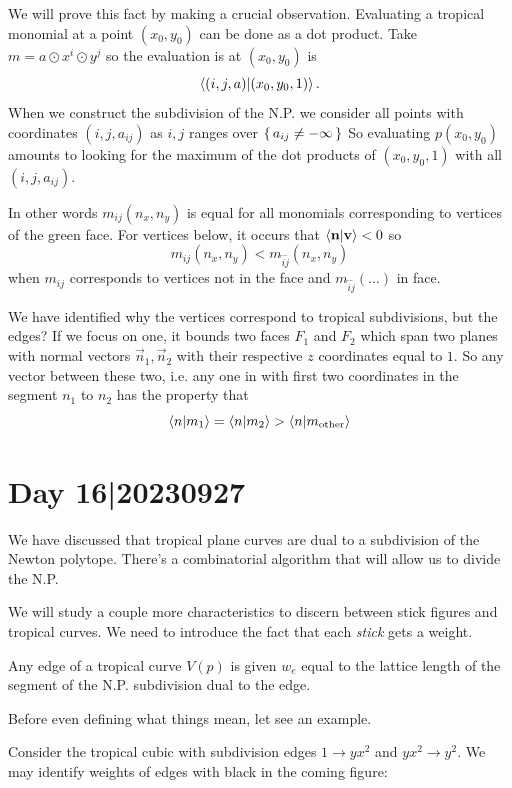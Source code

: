 \documentclass[12pt]{memoir}
\begin{document}
We will prove this fact by making a crucial observation. Evaluating a tropical monomial at a point $(x_0,y_0)$ can be done as a dot product. Take $m=a\odot x^i\odot y^j$ so the evaluation is at $(x_0,y_0)$ is 
$$\braket{(i,j,a)}{(x_0,y_0,1)}.$$
When we construct the subdivision of the N.P. we consider all points with coordinates $(i,j,a_{ij})$ as $i,j$ ranges over $\{\,a_{ij}\neq -\infty\,\}$
So evaluating $p(x_0,y_0)$ amounts to looking for the maximum of the dot products of $(x_0,y_0,1)$ with all $(i,j,a_{ij})$.\par 
{}\par 
In other words $m_{ij}(n_x,n_y)$ is equal for all monomials corresponding to vertices of the green face. For vertices below, it occurs that $\braket{\mathbf{n}}{\mathbf{v}}<0$ so 
$$m_{ij}(n_x,n_y)<m_{\tilde i\tilde j}(n_x,n_y)$$
when $m_{ij}$ corresponds to vertices not in the face and $m_{\tilde i\tilde j}(\dots)$ in face.\par 
We have identified why the vertices correspond to tropical subdivisions, but the edges? If we focus on one, it bounds two faces $F_1$ and $F_2$ which span two planes with normal vectors $\vec n_1,\vec n_2$ with their respective $z$ coordinates equal to $1$. So any vector between these two, i.e. any one in with first two coordinates in the segment $n_1$ to $n_2$ has the property that 
$$\braket{n}{m_1}=\braket{n}{m_2}>\braket{n}{m_{\text{other}}}$$ %

\section{Day 16|20230927}

We have discussed that tropical plane curves are dual to a subdivision of the Newton polytope. There's a combinatorial algorithm that will allow us to divide the N.P.\par 
We will study a couple more characteristics to discern between stick figures and tropical curves. We need to introduce the fact that each \emph{stick} gets a weight.

\begin{Def}
    Any edge of a tropical curve $V(p)$ is given  $w_e$ equal to the lattice length of the segment of the N.P. subdivision dual to the edge.
\end{Def}

Before even defining what things mean, let see an example. 

\begin{Ex}
    Consider the tropical cubic with subdivision edges $1\to yx^2$ and $yx^2\to y^2$. We may identify weights of edges with black in the coming figure:
    \begin{figure}[h!]
        \centering
    \end{figure}
\end{Ex}
\end{document}
